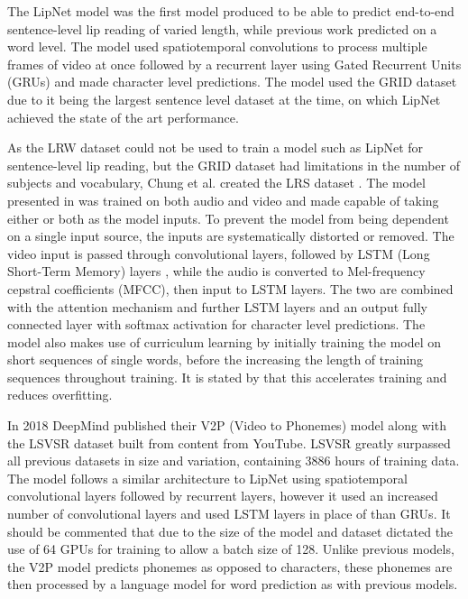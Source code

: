 \documentclass[12pt]{report}
\begin{document}
The LipNet model \cite{Assael2016} was the first model produced to be able to predict end-to-end sentence-level lip reading of varied length, while previous work predicted on a word level.
The model used spatiotemporal convolutions to process multiple frames of video at once followed by a recurrent layer using Gated Recurrent Units (GRUs) \cite{Cho2014} and made character level predictions.
The model used the GRID dataset \cite{Cooke2006} due to it being the largest sentence level dataset at the time, on which LipNet achieved the state of the art performance.

As the LRW dataset could not be used to train a model such as LipNet for sentence-level lip reading, but the GRID dataset had limitations in the number of subjects and vocabulary, Chung et al. created the LRS dataset \cite{Chung2017}.
The model presented in \cite{Chung2017} was trained on both audio and video and made capable of taking either or both as the model inputs.
To prevent the model from being dependent on a single input source, the inputs are systematically distorted or removed.
The video input is passed through convolutional layers, followed by LSTM (Long Short-Term Memory) layers \cite{Cheng2016}, while the audio is converted to Mel-frequency cepstral coefficients (MFCC), then input to LSTM layers.
The two are combined with the attention mechanism and further LSTM layers and an output fully connected layer with softmax activation for character level predictions.
The model also makes use of curriculum learning by initially training the model on short sequences of single words, before the increasing the length of training sequences throughout training.
It is stated by \cite{Chung2017} that this accelerates training and reduces overfitting.

In 2018 DeepMind published their V2P (Video to Phonemes) model \cite{Shillingford2018} along with the LSVSR dataset built from content from YouTube. 
LSVSR greatly surpassed all previous datasets in size and variation, containing 3886 hours of training data.
The model follows a similar architecture to LipNet \cite{Assael2016} using spatiotemporal convolutional layers followed by recurrent layers, however it used an increased number of convolutional layers and used LSTM layers in place of than GRUs.
It should be commented that due to the size of the model and dataset dictated the use of 64 GPUs for training to allow a batch size of 128.
Unlike previous models, the V2P model predicts phonemes as opposed to characters, these phonemes are then processed by a language model for word prediction as with previous models.
\end{document}
